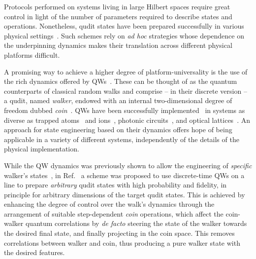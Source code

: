 Protocols performed on systems living in large Hilbert spaces require great control in light of the number of parameters required to describe states and operations. Nonetheless, qudit states have been prepared successfully in various physical settings~\cite{leibfried1996experimental,hofheinz2009synthesizing,neeley2009emulation,walborn2006quantum,lima2011experimental,rossi2009multipath,dada2011experimental,anderson2015accurate,heeres2017implementing,rosenblum2018cnot,chu2018creation}. Such schemes rely on \textit{ad hoc} strategies whose dependence on the underpinning dynamics makes their translation across different physical platforms difficult. 

A promising way to achieve a higher degree of platform-universality is the use of the rich dynamics offered by \acp{QW}~\cite{aharonov1993quantum,kempe2003quantum, venegasandraca2012quantum}. These can be thought of as the quantum counterparts of classical random walks and comprise -- in their discrete version -- a qudit, named \emph{walker}, endowed with an internal two-dimensional degree of freedom dubbed \emph{coin}~\cite{ambainis2001onedimensional}. \acp{QW} have been successfully implemented~\cite{manouchehri2014physical} in systems as diverse as trapped atoms~\cite{cote2006quantum} and ions~\cite{schmitz2009quantum,zhringer2010realization}, photonic circuits~\cite{perets2008realization,peruzzo2010quantum,broome2010discrete,schreiber2010photons,rohde2011multi,sansoni2012twoparticle,boutari2016large,cardano2015quantum,cardano2016statistical,caruso2016fast}, and optical lattices~\cite{meinert2014observation}. An approach for state engineering based on their dynamics offers hope of being applicable in a variety of different systems, independently of the details of the physical implementation.

While the \ac{QW} dynamics was previously shown to allow the engineering of {\it specific} walker's states~\cite{chandrashekar2008optimizing,majury2016robust}, in Ref.~\cite{innocenti2017quantum} a scheme was proposed to use discrete-time \acp{QW} on a line to prepare {\it arbitrary} qudit states with high probability and fidelity, in principle for arbitrary dimensions of the target qudit states.
This is achieved by enhancing the degree of control over the walk's dynamics through the arrangement of suitable step-dependent \emph{coin} operations, which affect the coin-walker quantum correlations by \emph{de facto} steering the state of the walker towards the desired final state, and finally projecting in the coin space. This removes correlations between walker and coin, thus producing a pure walker state with the desired features. 

